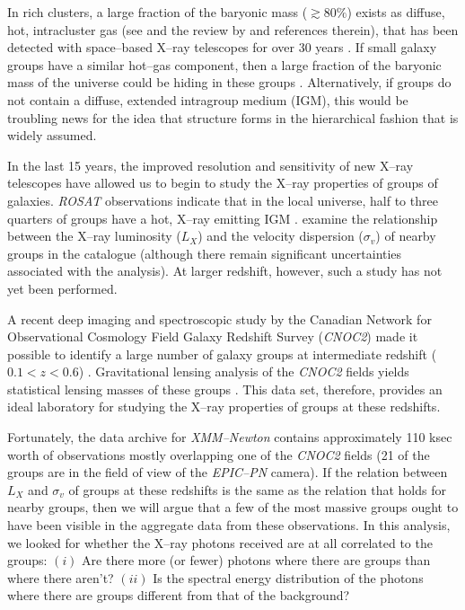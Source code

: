 \documentclass[12pt,preprint]{aastex}
\newcommand{\pn}[1]{\mbox{$(#1)$}}
\begin{document}
In rich clusters, a large fraction of the baryonic mass ($\gtrsim 80\%$) exists
as diffuse, hot, intracluster gas (see \citet{ettori_et_al2003} and the review
by \citet{rosati_et_al2002} and references therein), that has
been detected with space--based X--ray telescopes for over 30 years
\citep{giacconi_et_al1974, rowanrobinson+fabian1975, schwartz1978}.
If small galaxy groups have a similar hot--gas component, then a large fraction
of the baryonic mass of the universe could be hiding in these groups
\citep[and references therein]{fukugita+peebles2004}.
Alternatively, if groups do not contain a diffuse, extended intragroup medium
(IGM), this would be troubling news for the idea that structure forms
in the hierarchical fashion that is widely assumed.

In the last 15 years, the improved resolution and sensitivity of new X--ray
telescopes have allowed us to begin to study the X--ray properties of groups
of galaxies.  \textsl{ROSAT} observations indicate that in the local universe,
half to three quarters of groups have a hot, X--ray emitting IGM
\citep{mulchaey2000}.  
\citet*[hereafter PT04]{plionis+tovmassian2004} examine the relationship
between the X--ray luminosity ($L_X$) and the velocity dispersion
($\sigma_v$) of nearby groups in the \citet[hereafter M03]{mulchaey_et_al2003}
catalogue (although there remain significant uncertainties associated with the
analysis).  At larger redshift, however, such a study
has not yet been performed.

A recent deep imaging and spectroscopic study by the Canadian Network for
Observational Cosmology Field Galaxy Redshift Survey (\textsl{CNOC2}) made
it possible to identify a large number of galaxy groups at intermediate
redshift ($0.1 < z < 0.6$) \citep{carlberg2001eg, carlberg2001gg}.
Gravitational lensing analysis of the \textsl{CNOC2}
fields yields statistical lensing masses of these groups
\citep{hoekstra_et_al2001}.
This data set, therefore, provides an ideal laboratory for
studying the X--ray properties of groups at these redshifts.

Fortunately, the data archive for \textsl{XMM--Newton} contains
approximately 110 ksec worth of observations mostly overlapping one of the
\textsl{CNOC2} fields (21 of the groups are in the field of view of the
\textsl{EPIC--PN} camera).
If the relation between $L_X$ and $\sigma_v$ of groups at these redshifts
is the same as the relation that holds for nearby groups,
then we will argue that a few of the most
massive groups ought to have been visible in the aggregate data from
these observations.  In this analysis, we looked for whether the X--ray
photons received are at all correlated to the groups:
\pn{i} Are there more (or fewer) photons
where there are groups than where there aren't?
\pn{ii} Is the spectral energy distribution of the
photons where there are groups different from that of the background? 
\end{document}
